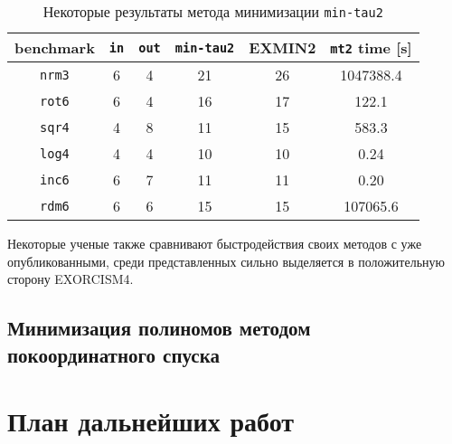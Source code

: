 \documentclass[a4paper,12pt,titlepage,finall]{article}
\begin{document}
\begin{table}[h!]
\centering
\begin{tabular}{ |c||c|c||c|c|c| }
\hline
\textbf{benchmark} & \texttt{\bf in} & \texttt{\bf out} & \texttt{min-tau2} & \textsc{EXMIN2} & \texttt{mt2} time [s] \\
\hline\hline
\texttt{nrm3} & 6 & 4 & 21 & 26 & 1047388.4 \\
\hline
\texttt{rot6} & 6 & 4 & 16 & 17 & 122.1     \\
\hline
\texttt{sqr4} & 4 & 8 & 11 & 15 & 583.3     \\
\hline\hline
\texttt{log4} & 4 & 4 & 10 & 10 & 0.24      \\
\hline
\texttt{inc6} & 6 & 7 & 11 & 11 & 0.20      \\
\hline
\texttt{rdm6} & 6 & 6 & 15 & 15 & 107065.6  \\
\hline
\end{tabular}
\caption{Некоторые результаты метода минимизации \texttt{min-tau2}}
\label{table_mintau}
\end{table}

Некоторые ученые также сравнивают быстродействия своих методов с уже опубликованными, среди представленных сильно выделяется в положительную сторону \textsc{EXORCISM4}.

\subsection{Минимизация полиномов методом покоординатного спуска}


\section{План дальнейших работ}

\end{document}
